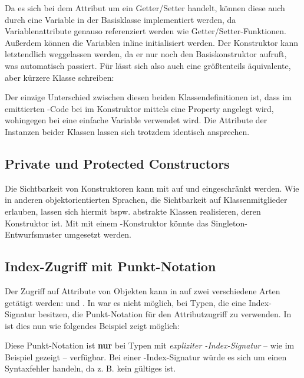 
Da es sich bei dem Attribut  um ein Getter/Setter handelt, können diese auch durch eine Variable in der Basisklasse implementiert werden, da Variablenattribute genauso referenziert werden wie Getter/Setter-Funktionen. Außerdem können die Variablen inline initialisiert werden. Der Konstruktor kann letztendlich weggelassen werden, da er nur noch den Basiskonstruktor aufruft, was automatisch passiert. Für  lässt sich also auch eine größtenteils äquivalente, aber kürzere Klasse  schreiben:


Der einzige Unterschied zwischen diesen beiden Klassendefinitionen ist, dass im emittierten \js-Code bei  im Konstruktor mittels  eine Property angelegt wird, wohingegen bei  eine einfache Variable verwendet wird. Die Attribute der Instanzen beider Klassen lassen sich trotzdem identisch ansprechen.

\subsection{Private und Protected Constructors}
Die Sichtbarkeit von Konstruktoren kann mit  auf \tsprotected und \tsprivate eingeschränkt werden. Wie in anderen objektorientierten Sprachen, die Sichtbarkeit auf Klassenmitglieder erlauben, lassen sich hiermit bspw. abstrakte Klassen realisieren, deren Konstruktor \tsprotected ist. Mit mit einem \tsprivate-Konstruktor könnte das Singleton-Entwurfsmuster umgesetzt werden.

\subsection{Index-Zugriff mit Punkt-Notation}
Der Zugriff auf Attribute von Objekten kann in \js auf zwei verschiedene Arten getätigt werden:  und . In  war es nicht möglich, bei Typen, die eine Index-Signatur besitzen, die Punkt-Notation für den Attributzugriff zu verwenden. In  ist dies nun wie folgendes Beispiel zeigt möglich:


Diese Punkt-Notation ist \textbf{nur} bei Typen mit \textit{expliziter \tsstring-Index-Signatur} -- wie im Beispiel gezeigt -- verfügbar. Bei einer \tsnumber-Index-Signatur würde es sich um einen Syntaxfehler handeln, da z. B.  kein gültiges \ts ist.

